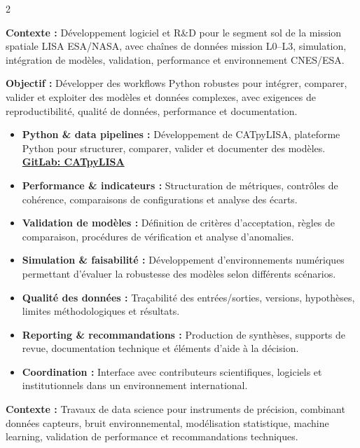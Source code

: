 \documentclass[8pt,a4paper,ragged2e,withhyper]{altacv}
\begin{document}
\begin{paracol}{2}
\divider


\textbf{Contexte :} Développement logiciel et R\&D pour le segment sol de la mission spatiale LISA ESA/NASA, avec chaînes de données mission L0--L3, simulation, intégration de modèles, validation, performance et environnement CNES/ESA.

\textbf{Objectif :} Développer des workflows Python robustes pour intégrer, comparer, valider et exploiter des modèles et données complexes, avec exigences de reproductibilité, qualité de données, performance et documentation.

\begin{itemize}
  \item \textbf{Python \& data pipelines :} Développement de CATpyLISA, plateforme Python pour structurer, comparer, valider et documenter des modèles.
  \textcolor{DarkPastelRed}{\href{https://gitlab.oca.eu/gboileau/lisa_l3_tools}{\bf GitLab: CATpyLISA}}
  \item \textbf{Performance \& indicateurs :} Structuration de métriques, contrôles de cohérence, comparaisons de configurations et analyse des écarts.
  \item \textbf{Validation de modèles :} Définition de critères d'acceptation, règles de comparaison, procédures de vérification et analyse d'anomalies.
  \item \textbf{Simulation \& faisabilité :} Développement d'environnements numériques permettant d'évaluer la robustesse des modèles selon différents scénarios.
  \item \textbf{Qualité des données :} Traçabilité des entrées/sorties, versions, hypothèses, limites méthodologiques et résultats.
  \item \textbf{Reporting \& recommandations :} Production de synthèses, supports de revue, documentation technique et éléments d'aide à la décision.
  \item \textbf{Coordination :} Interface avec contributeurs scientifiques, logiciels et institutionnels dans un environnement international.
\end{itemize}

\divider


\textbf{Contexte :} Travaux de data science pour instruments de précision, combinant données capteurs, bruit environnemental, modélisation statistique, machine learning, validation de performance et recommandations techniques.


\end{paracol}
\end{document}
